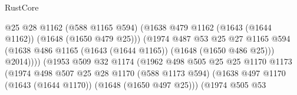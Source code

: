 \begin{lexlean}{RustCore}
\begin{coremodule}
                                              @25
                                              @28
                                              @1162
                                              (@588 @1165 @594)
                                              (@1638
                                                @479
                                                @1162
                                                (@1643 (@1644 @1162))
                                                (@1648 (@1650 @479 @25)))
                                              (@1974
                                                @487
                                                @53
                                                @25
                                                @27
                                                @1165
                                                @594
                                                (@1638
                                                  @486
                                                  @1165
                                                  (@1643 (@1644 @1165))
                                                  (@1648 (@1650 @486 @25)))
                                                @2014))))
                                        (@1953
                                          @509
                                          @32
                                          @1174
                                          (@1962
                                            @498
                                            @505
                                            @25
                                            @25
                                            @1170
                                            @1173
                                            (@1974
                                              @498
                                              @507
                                              @25
                                              @28
                                              @1170
                                              (@588 @1173 @594)
                                              (@1638
                                                @497
                                                @1170
                                                (@1643 (@1644 @1170))
                                                (@1648 (@1650 @497 @25)))
                                              (@1974
                                                @505
                                                @53

\end{coremodule}
\end{lexlean}
